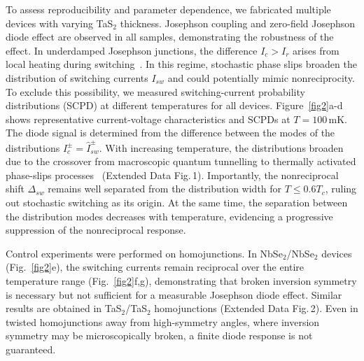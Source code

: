 \documentclass[twocolumn,secnumarabic,amssymb, nobibnotes, aps, prl, superscriptaddress]{revtex4-2}
\begin{document}
To assess reproducibility and parameter dependence, we fabricated multiple devices with varying TaS$_2$ thickness. Josephson coupling and zero-field Josephson diode effect are observed in all samples, demonstrating the robustness of the effect. In underdamped Josephson junctions, the difference $I_c> I_r$ arises from local heating during switching~\cite{cuo08}. In this regime, stochastic phase slips broaden the distribution of switching currents $I_{sw}$ and could potentially mimic nonreciprocity. To exclude this possibility, we measured switching-current probability distributions (SCPD) at different temperatures for all devices. Figure~\ref{fig2}a-d shows representative current-voltage characteristics and SCPDs at $T=100\, \text{mK}$. The diode signal is determined from the difference between the modes of the distributions $I_c^{\pm}=\hat{I}_{sw}^{\pm}$. With increasing temperature, the distributions broaden due to the crossover from macroscopic quantum tunnelling to thermally activated phase-slips processes~\cite{pug20} (Extended Data Fig.\,1). Importantly, the nonreciprocal shift $\Delta_{sw}$ remains well separated from the distribution width for $T \leq 0.6 T_c$, ruling out stochastic switching as its origin. At the same time, the separation between the distribution modes decreases with temperature, evidencing a progressive suppression of the nonreciprocal response.

Control experiments were performed on homojunctions. In NbSe$_2$/NbSe$_2$ devices (Fig.~\ref{fig2}e), the switching currents remain reciprocal over the entire temperature range  (Fig.~\ref{fig2}f,g), demonstrating that broken inversion symmetry is necessary but not sufficient for a measurable Josephson diode effect. Similar results are obtained in TaS$_2$/TaS$_2$ homojunctions (Extended Data Fig.\,2). Even in twisted homojunctions away from high-symmetry angles, where inversion symmetry may be microscopically broken, a finite diode response is not guaranteed.
\end{document}
